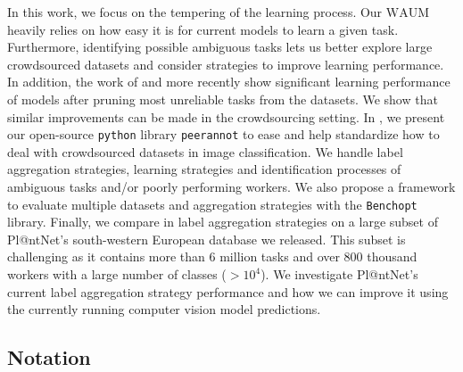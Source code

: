 In this work, we focus on the tempering of the learning process.
Our $\mathrm{WAUM}$ heavily relies on how easy it is for current models to learn a given task.
Furthermore, identifying possible ambiguous tasks lets us better explore large crowdsourced datasets and consider strategies to improve learning performance.
In addition, the work of \citet{merler2004bias} and more recently \citet{pleiss_identifying_2020} show significant learning performance of models after pruning most unreliable tasks from the datasets.
We show that similar improvements can be made in the crowdsourcing setting.
In , we present our open-source \texttt{python} library \texttt{peerannot} to ease and help standardize how to deal with crowdsourced datasets in image classification.
We handle label aggregation strategies, learning strategies and identification processes of ambiguous tasks and/or poorly performing workers.
We also propose a framework to evaluate multiple datasets and aggregation strategies with the \texttt{Benchopt} library.
Finally, we compare in  label aggregation strategies on a large subset of Pl@ntNet's south-western European database we released.
This subset is challenging as it contains more than $6$ million tasks and over $800$ thousand workers with a large number of classes ($>10^4$).
We investigate Pl@ntNet's current label aggregation strategy performance and how we can improve it using the currently running computer vision model predictions.

\subsection{Notation}

